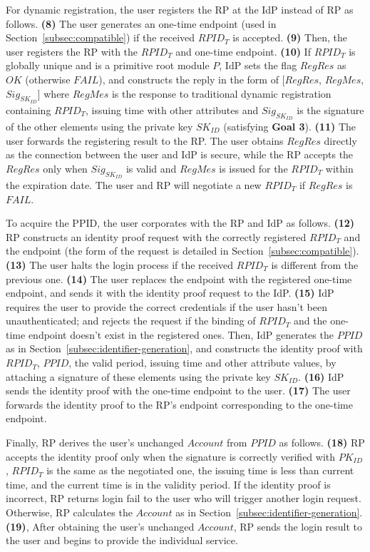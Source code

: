 For dynamic registration, the user registers the RP at the IdP instead of RP as follows. \textbf{(8)} The user generates an one-time endpoint (used in Section~\ref{subsec:compatible}) if the received $RPID_T$ is accepted. \textbf{(9)} Then, the user registers the RP with the $RPID_T$ and one-time endpoint. \textbf{(10)} If $RPID_T$ is globally unique and is a primitive root module $P$, IdP sets the flag $RegRes$ as $OK$ (otherwise $FAIL$), and constructs the reply in the form of 
[$RegRes$, $RegMes$, $Sig_{SK_{ID}}$] 
where $RegMes$ is the response to traditional dynamic registration containing $RPID_T$, issuing time with other attributes and $Sig_{SK_{ID}}$ is the signature of the other elements using the private key $SK_{ID}$ (satisfying \textbf{Goal 3}). \textbf{(11)} The user forwards the registering result to the RP. The user obtains $RegRes$ directly as the connection between the user and IdP is secure, while the RP accepts the $RegRes$ only when $Sig_{SK_{ID}}$ is valid
and $RegMes$ is issued for the $RPID_T$ within the expiration date. The user and RP will negotiate a new $RPID_T$ if $RegRes$ is $FAIL$.

To acquire the PPID, the user corporates with the RP and IdP as follows. \textbf{(12)} RP constructs an identity proof request with the correctly registered $RPID_T$ and the endpoint (the form of the request is detailed in Section~\ref{subsec:compatible}). \textbf{(13)} The user halts the login process if the received $RPID_T$ is different from the previous one. \textbf{(14)} The user replaces the endpoint with the registered one-time endpoint, and sends it with the identity proof request to the IdP. \textbf{(15)} IdP requires the user to provide the correct credentials if the user hasn't been unauthenticated; and rejects the request if the binding of $RPID_T$ and the one-time endpoint doesn't exist in the registered ones. Then, IdP generates the $PPID$ as in Section~\ref{subsec:identifier-generation}, and constructs the identity proof with $RPID_T$, $PPID$, the valid period, issuing time and other attribute values, by attaching a signature of these elements using the private key $SK_{ID}$. \textbf{(16)} IdP sends the identity proof with the one-time endpoint to the user. \textbf{(17)} The user forwards the identity proof to the RP's endpoint corresponding to the one-time endpoint.

Finally, RP derives the user's unchanged $Account$ from $PPID$ as follows. \textbf{(18)} RP accepts the identity proof only when the signature is correctly verified with $PK_{ID}$, $RPID_T$ is the same as the negotiated one, the issuing time is less than current time, and the current time is in the validity period. If the identity proof is incorrect, RP returns login fail to the user who will trigger another login request. Otherwise, RP calculates the $Account$ as in Section~\ref{subsec:identifier-generation}. \textbf{(19)}, After obtaining the user's unchanged $Account$, RP sends the login result to the user and begins to provide the individual service.


